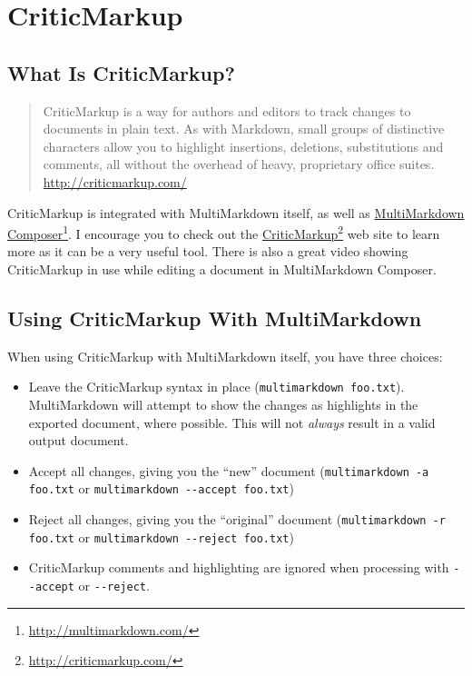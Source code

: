 \section{CriticMarkup}
\label{criticmarkup}

\subsection{What Is CriticMarkup?}
\label{whatiscriticmarkup}

\begin{quote}
CriticMarkup is a way for authors and editors to track changes to documents in plain text. As with Markdown, small groups of distinctive characters allow you to highlight insertions, deletions, substitutions and comments, all without the overhead of heavy, proprietary office suites. \href{http://criticmarkup.com/}{http:\slash{}\slash{}criticmarkup.com\slash{}}
\end{quote}

CriticMarkup is integrated with MultiMarkdown itself, as well as \href{http://multimarkdown.com/}{MultiMarkdown Composer}\footnote{\href{http://multimarkdown.com/}{http:\slash{}\slash{}multimarkdown.com\slash{}}}. I encourage you to check out the \href{http://criticmarkup.com/}{CriticMarkup}\footnote{\href{http://criticmarkup.com/}{http:\slash{}\slash{}criticmarkup.com\slash{}}} web site to learn more as it can be a very useful tool. There is also a great video showing CriticMarkup in use while editing a document in MultiMarkdown Composer.

\subsection{Using CriticMarkup With MultiMarkdown}
\label{usingcriticmarkupwithmultimarkdown}

When using CriticMarkup with MultiMarkdown itself, you have three choices:

\begin{itemize}
\item Leave the CriticMarkup syntax in place (\texttt{multimarkdown foo.txt}). MultiMarkdown will attempt to show the changes as highlights in the exported document, where possible. This will not \emph{always} result in a valid output document.

\item Accept all changes, giving you the ``new'' document (\texttt{multimarkdown -a foo.txt} or \texttt{multimarkdown -{}-accept foo.txt})

\item Reject all changes, giving you the ``original'' document (\texttt{multimarkdown -r foo.txt} or \texttt{multimarkdown -{}-reject foo.txt})

\item CriticMarkup comments and highlighting are ignored when processing with \texttt{-{}-accept} or \texttt{-{}-reject}.

\end{itemize}

